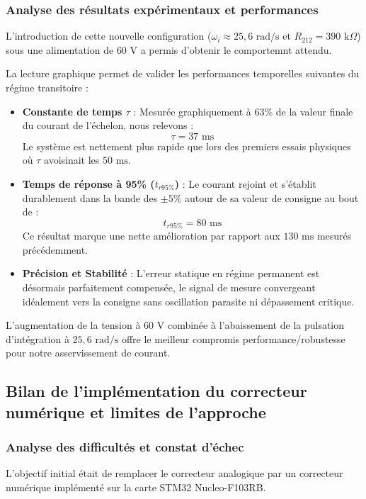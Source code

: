 \documentclass[11pt]{report}
\begin{document}
\subsubsection{Analyse des résultats expérimentaux et performances}
L'introduction de cette nouvelle configuration ($\omega_i \approx 25,6\text{ rad/s}$ et $R_{212} = 390\text{ k}\Omega$) sous une alimentation de $60\text{ V}$ a permis d'obtenir le comportemnt attendu.

La lecture graphique permet de valider les performances temporelles suivantes du régime transitoire :
\begin{itemize}
    \item \textbf{Constante de temps $\tau$} : Mesurée graphiquement à $63\%$ de la valeur finale du courant de l'échelon, nous relevons :
    \begin{equation*}
        \tau = 37\text{ ms}
    \end{equation*}
    Le système est nettement plus rapide que lors des premiers essais physiques où $\tau$ avoisinait les $50\text{ ms}$.
    
    \item \textbf{Temps de réponse à 95\% ($t_{r95\%}$)} : Le courant rejoint et s'établit durablement dans la bande des $\pm 5\%$ autour de sa valeur de consigne au bout de :
    \begin{equation*}
        t_{r95\%} = 80\text{ ms}
    \end{equation*}
    Ce résultat marque une nette amélioration par rapport aux $130\text{ ms}$ mesurés précédemment.
    
    \item \textbf{Précision et Stabilité} : L'erreur statique en régime permanent est désormais parfaitement compensée, le signal de mesure convergeant idéalement vers la consigne sans oscillation parasite ni dépassement critique.
\end{itemize}

L'augmentation de la tension à $60\text{ V}$ combinée à l'abaissement de la pulsation d'intégration à $25,6\text{ rad/s}$ offre le meilleur compromis performance/robustesse pour notre asservissement de courant.

\subsection{Bilan de l'implémentation du correcteur numérique et limites de l'approche}

\subsubsection{Analyse des difficultés et constat d'échec}
L'objectif initial était de remplacer le correcteur analogique par un correcteur numérique implémenté sur la carte STM32 Nucleo-F103RB.
\end{document}
